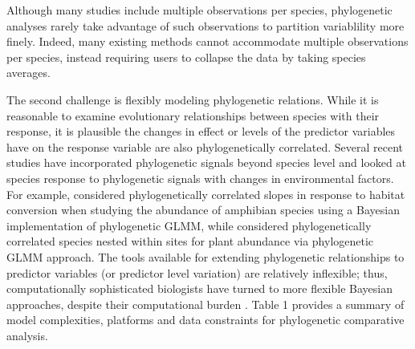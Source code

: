 \documentclass[12pt]{article}
\begin{document}
Although many studies include multiple observations per species, phylogenetic analyses rarely take advantage of such observations to partition variablility more finely.
Indeed, many existing methods cannot accommodate multiple observations per species, instead requiring users to collapse the data by taking species averages.

The second challenge is flexibly modeling phylogenetic relations.
While it is reasonable to examine evolutionary relationships between species with their response, it is plausible the changes in effect or levels of the predictor variables have on the response variable are also phylogenetically correlated. 
Several recent studies have incorporated phylogenetic signals beyond species level and looked at species response to phylogenetic signals with changes in environmental factors.
For example, \cite{nowakowski2018phylogenetic} considered phylogenetically correlated slopes in response to habitat conversion when studying the abundance of amphibian species using a Bayesian implementation of phylogenetic GLMM, while \cite{li2017canfun} considered phylogenetically correlated species nested within sites for plant abundance via phylogenetic GLMM approach. 
The tools available for extending phylogenetic relationships to predictor variables (or predictor level variation) are relatively inflexible; thus, computationally sophisticated biologists have turned to more flexible Bayesian approaches, despite their computational burden \citep{hadfield2010mcmc, burkner2016brms}.
Table 1 provides a summary of model complexities, platforms and data constraints for phylogenetic comparative analysis.

\newcommand{\pkg}[1]{{\tt #1}}
\newcommand{\code}[1]{{\tt #1}}
\end{document}
